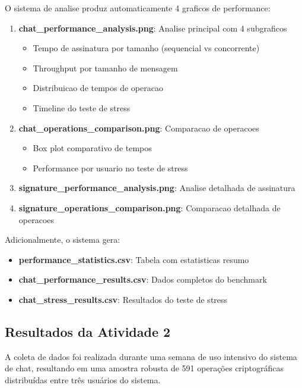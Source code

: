 \documentclass[12pt,a4paper,oneside]{article}
\begin{document}
O sistema de analise produz automaticamente 4 graficos de performance:

\begin{enumerate}
    \item \textbf{chat\_performance\_analysis.png}: Analise principal com 4 subgraficos
    \begin{itemize}
        \item Tempo de assinatura por tamanho (sequencial vs concorrente)
        \item Throughput por tamanho de mensagem
        \item Distribuicao de tempos de operacao
        \item Timeline do teste de stress
    \end{itemize}
    
    \item \textbf{chat\_operations\_comparison.png}: Comparacao de operacoes
    \begin{itemize}
        \item Box plot comparativo de tempos
        \item Performance por usuario no teste de stress
    \end{itemize}
    
    \item \textbf{signature\_performance\_analysis.png}: Analise detalhada de assinatura
    
    \item \textbf{signature\_operations\_comparison.png}: Comparacao detalhada de operacoes
\end{enumerate}

Adicionalmente, o sistema gera:
\begin{itemize}
    \item \textbf{performance\_statistics.csv}: Tabela com estatisticas resumo
    \item \textbf{chat\_performance\_results.csv}: Dados completos do benchmark
    \item \textbf{chat\_stress\_results.csv}: Resultados do teste de stress
\end{itemize}

\subsection{Resultados da Atividade 2}

A coleta de dados foi realizada durante uma semana de uso intensivo do sistema de chat, resultando em uma amostra robusta de 591 operações criptográficas distribuídas entre três usuários do sistema.
\end{document}
